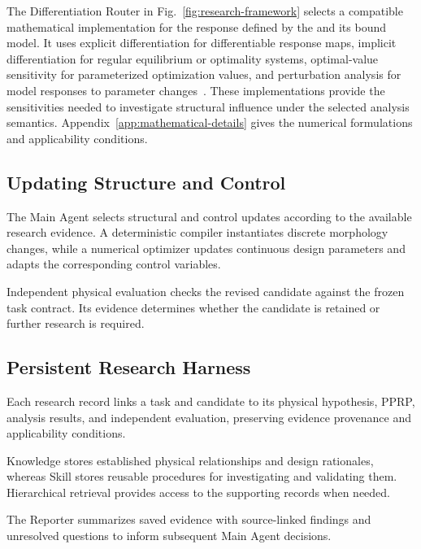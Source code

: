 The Differentiation Router in Fig.~\ref{fig:research-framework} selects a compatible mathematical implementation for the response defined by the \PPRP{} and its bound model. It uses explicit differentiation for differentiable response maps, implicit differentiation for regular equilibrium or optimality systems, optimal-value sensitivity for parameterized optimization values, and perturbation analysis for model responses to parameter changes~\cite{bonnans2000perturbation,nocedal2006numerical}. These implementations provide the sensitivities needed to investigate structural influence under the selected analysis semantics. Appendix~\ref{app:mathematical-details} gives the numerical formulations and applicability conditions.

\subsection{Updating Structure and Control}
\label{subsec:structure-control-refinement}

The Main Agent selects structural and control updates according to the available research evidence. A deterministic compiler instantiates discrete morphology changes, while a numerical optimizer updates continuous design parameters and adapts the corresponding control variables.

Independent physical evaluation checks the revised candidate against the frozen task contract. Its evidence determines whether the candidate is retained or further research is required.

\subsection{Persistent Research Harness}
\label{subsec:research-continuity-method}

Each research record links a task and candidate to its physical hypothesis, PPRP, analysis results, and independent evaluation, preserving evidence provenance and applicability conditions.

Knowledge stores established physical relationships and design rationales, whereas Skill stores reusable procedures for investigating and validating them. Hierarchical retrieval provides access to the supporting records when needed.

The Reporter summarizes saved evidence with source-linked findings and unresolved questions to inform subsequent Main Agent decisions.

